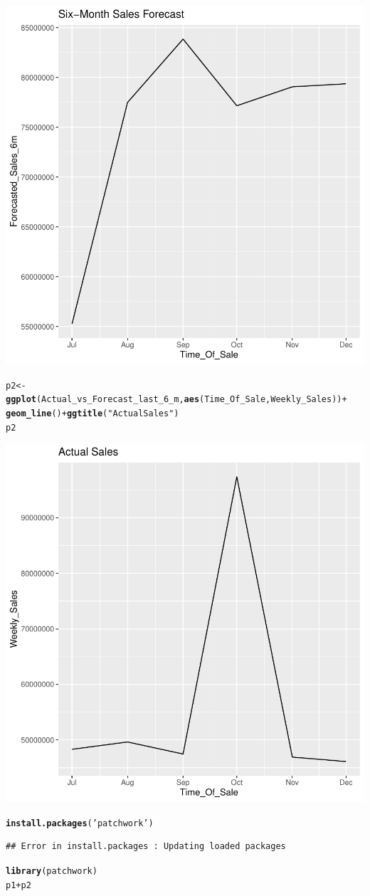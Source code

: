\documentclass{article}\usepackage[]{graphicx}\usepackage[]{color}
\makeatletter
\newcommand{\hlstr}[1]{\textcolor[rgb]{0.192,0.494,0.8}{#1}}%
\newcommand{\hlopt}[1]{\textcolor[rgb]{0,0,0}{#1}}%
\newcommand{\hlstd}[1]{\textcolor[rgb]{0.345,0.345,0.345}{#1}}%
\newcommand{\hlkwb}[1]{\textcolor[rgb]{0.69,0.353,0.396}{#1}}%
\newcommand{\hlkwd}[1]{\textcolor[rgb]{0.737,0.353,0.396}{\textbf{#1}}}%
\newenvironment{kframe}{%
 \def\at@end@of@kframe{}%
 \ifinner\ifhmode%
  \def\at@end@of@kframe{\end{minipage}}%
  \begin{minipage}{\columnwidth}%
 \fi\fi%
 \def\FrameCommand##1{\hskip\@totalleftmargin \hskip-\fboxsep
 \colorbox{shadecolor}{##1}\hskip-\fboxsep
     \hskip-\linewidth \hskip-\@totalleftmargin \hskip\columnwidth}%
 \MakeFramed {\advance\hsize-\width
   \@totalleftmargin\z@ \linewidth\hsize
   \@setminipage}}%
 {\par\unskip\endMakeFramed%
 \at@end@of@kframe}
\newenvironment{knitrout}{}{} %
\makeatother
\begin{document}
\begin{knitrout}
{\centering \includegraphics[width=.6\linewidth]{figure/Walmart-Sales-Rnwauto-report-3} 

}


\begin{kframe}\begin{alltt}
\hlstd{p2}\hlkwb{<-}\hlkwd{ggplot}\hlstd{(Actual_vs_Forecast_last_6_m,} \hlkwd{aes}\hlstd{(Time_Of_Sale, Weekly_Sales))}\hlopt{+}
  \hlkwd{geom_line}\hlstd{()}\hlopt{+}\hlkwd{ggtitle}\hlstd{(}\hlstr{"Actual Sales"}\hlstd{)}
\hlstd{p2}
\end{alltt}
\end{kframe}

{\centering \includegraphics[width=.6\linewidth]{figure/Walmart-Sales-Rnwauto-report-4} 

}


\begin{kframe}\begin{alltt}
\hlkwd{install.packages}\hlstd{(}\hlstr{'patchwork'}\hlstd{)}
\end{alltt}
\begin{verbatim}
## Error in install.packages : Updating loaded packages
\end{verbatim}
\begin{alltt}
\hlkwd{library}\hlstd{(patchwork)}
\hlstd{p1}\hlopt{+}\hlstd{p2}
\end{alltt}
\end{kframe}


\end{knitrout}
\end{document}
